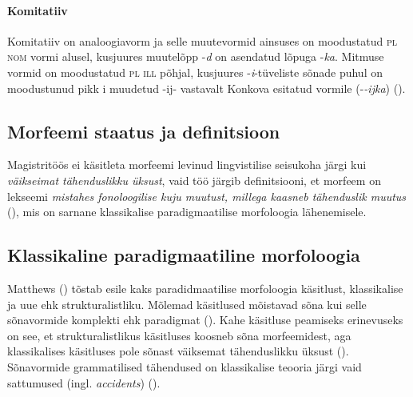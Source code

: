 \documentclass[12pt,a4paper]{article}
\newcommand{\msd}[1]{\textsc{#1}}
\begin{document}
\paragraph*{Komitatiiv}
Komitatiiv on analoogiavorm ja selle muutevormid ainsuses on moodustatud \msd{pl nom} vormi alusel, kusjuures muutelõpp -\textit{d} on asendatud lõpuga -\textit{ka}. Mitmuse vormid on moodustatud \msd{pl ill} põhjal, kusjuures -\textit{i}-tüveliste sõnade puhul on moodustunud pikk i muudetud -ij- vastavalt Konkova esitatud vormile (-\textit{-ijka}) (\cite[10]{konkova_vaddceeli_2014}).






\subsection{Morfeemi staatus ja definitsioon}
\label{sec:morfeemi-staatus}


Magistritöös ei käsitleta morfeemi levinud lingvistilise seisukoha järgi kui \textit{väikseimat tähenduslikku üksust}, vaid töö järgib definitsiooni, et morfeem on lekseemi \textit{mistahes fonoloogilise kuju muutust, millega kaasneb tähenduslik muutus} (\cites[31]{beard_morpheme_1987}[49]{beard_lexeme-morpheme_1995}), %
mis on sarnane klassikalise paradigmaatilise morfoloogia lähenemisele.




\subsection{Klassikaline paradigmaatiline morfoloogia}
\label{klassikaline-paradigmaatiline}


Matthews (\citeyear[186]{matthews_morphology_1991}) tõstab esile kaks paradidmaatilise morfoloogia käsitlust, klassikalise ja uue ehk strukturalistliku.
Mõlemad käsitlused mõistavad sõna kui selle sõnavormide komplekti ehk paradigmat (\cite[186]{matthews_morphology_1991}). 
Kahe käsitluse peamiseks erinevuseks on see, et strukturalistlikus käsitluses koosneb sõna morfeemidest, aga klassikalises käsitluses pole sõnast väiksemat tähenduslikku üksust (\cite[196]{matthews_morphology_1991}). Sõnavormide grammatilised tähendused on klassikalise teooria järgi vaid sattumused (ingl. \textit{accidents}) (\cite[189]{matthews_morphology_1991}). %
\end{document}
